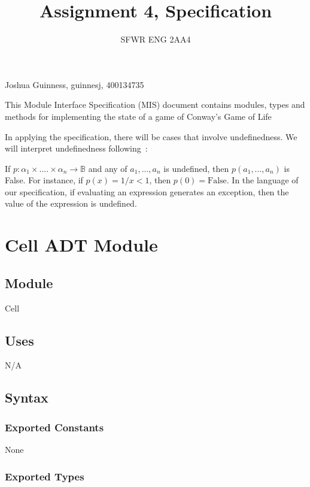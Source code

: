 \documentclass[12pt]{article}
\title{Assignment 4, Specification}
\author{SFWR ENG 2AA4}
\begin{document}
\maketitle
\begin{center}
    Joshua Guinness, guinnesj, 400134735
\end{center}
\medskip

This Module Interface Specification (MIS) document contains modules, types and
methods for implementing the state of a game of Conway's Game of Life

In applying the specification, there will be cases that involve undefinedness.
We will interpret undefinedness following~\cite{Farmer2004}:

If $p: \alpha_1 \times .... \times \alpha_n \rightarrow \mathbb{B}$ and any of
$a_1, ..., a_n$ is undefined, then $p(a_1, ..., a_n)$ is False.  For instance,
if $p(x) = 1/x < 1$, then $p(0) = \text{False}$.  In the language of our
specification, if evaluating an expression generates an exception, then the
value of the expression is undefined.




\newpage

\section* {Cell ADT Module}

\subsection*{Module}

Cell

\subsection* {Uses}

N/A

\subsection* {Syntax}

\subsubsection* {Exported Constants}

None

\subsubsection* {Exported Types}
\end{document}
